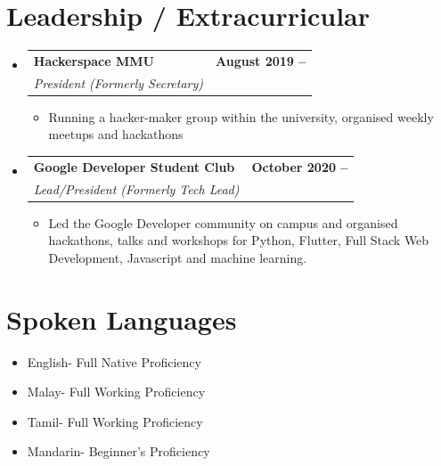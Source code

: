 \documentclass[letterpaper,12pt]{article}
\makeatletter
\newcommand{\resumeItem}[1]{
  \item\small{
    {#1 \vspace{-2pt}}
  }
}
\newcommand{\resumeSubheading}[4]{
  \vspace{-2pt}\item
    \begin{tabular*}{1.0\textwidth}[t]{l@{\extracolsep{\fill}}r}
      \textbf{#1} & \textbf{\small #2} \\
      \textit{\small#3} & \textit{\small #4} \\
    \end{tabular*}\vspace{-7pt}
}
\newcommand{\resumeSubHeadingListStart}{\begin{itemize}[leftmargin=0.0in, label={}]}
\newcommand{\resumeSubHeadingListEnd}{\end{itemize}}
\newcommand{\resumeItemListStart}{\begin{itemize}}
\newcommand{\resumeItemListEnd}{\end{itemize}\vspace{-5pt}}
\makeatother
\begin{document}
\section{Leadership / Extracurricular}
    \resumeSubHeadingListStart
        \resumeSubheading{Hackerspace MMU}{August 2019 --}{President (Formerly Secretary)}{}
            \resumeItemListStart
                \resumeItem{Running a hacker-maker group within the university, organised weekly meetups and hackathons}
            \resumeItemListEnd
        \resumeSubheading{Google Developer Student Club}{October 2020 -- }{Lead/President (Formerly Tech Lead)}{}
            \resumeItemListStart
                \resumeItem{Led the Google Developer community on campus and organised hackathons, talks and workshops for Python, Flutter, Full Stack Web Development, Javascript and machine learning.}
            \resumeItemListEnd
    \resumeSubHeadingListEnd

    \section{Spoken Languages}
    \resumeItemListStart
        \resumeItem{English- Full Native Proficiency}
        \resumeItem{Malay- Full Working Proficiency}
        \resumeItem{Tamil- Full Working Proficiency}
        \resumeItem{Mandarin- Beginner's Proficiency}
    \resumeItemListEnd
\end{document}
